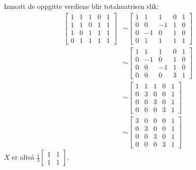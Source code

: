 \documentclass[11pt, a4paper, norsk]{NTNUoving}
\begin{document}
\begin{oppgave}[4]
    \begin{punkt}
        Innsatt de oppgitte verdiene blir totalmatrisen slik:
        \begin{align*}
            \left[
                \begin{array}{cccc|c}
                    1 & 1 & 1 & 0 & 1\\
                    1 & 1 & 0 & 1 & 1\\
                    1 & 0 & 1 & 1 & 1\\
                    0 & 1 & 1 & 1 & 1
                \end{array}
            \right]     
            &\sim
            \left[
                \begin{array}{cccc|c}
                    1 & 1 & 1 & 0 & 1\\
                    0 & 0 & -1 & 1 & 0\\
                    0 & -1 & 0 & 1 & 0\\
                    0 & 1 & 1 & 1 & 1
                \end{array}
            \right]  
            \\&\sim
            \left[
                \begin{array}{cccc|c}
                    1 & 1 & 1 & 0 & 1\\
                    0 & -1 & 0 & 1 & 0\\
                    0 & 0 & -1 & 1 & 0\\
                    0 & 0 & 0 & 3 & 1
                \end{array}
            \right] 
            \\&\sim
            \left[
                \begin{array}{cccc|c}
                    1 & 1 & 1 & 0 & 1\\
                    0 & 3 & 0 & 0 & 1\\
                    0 & 0 & 3 & 0 & 1\\
                    0 & 0 & 0 & 3 & 1
                \end{array}
            \right] 
            \\&\sim
            \left[
                \begin{array}{cccc|c}
                    3 & 0 & 0 & 0 & 1\\
                    0 & 3 & 0 & 0 & 1\\
                    0 & 0 & 3 & 0 & 1\\
                    0 & 0 & 0 & 3 & 1
                \end{array}
            \right] 
        \end{align*}
        $X$ er altså $\frac{1}{3}\begin{bmatrix} 1 & 1\\ 1 & 1 \end{bmatrix}$.
        
    \end{punkt}
\end{oppgave}
\end{document}
